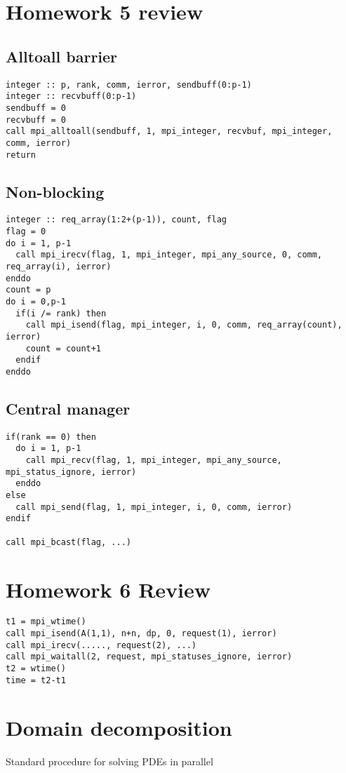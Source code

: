 \documentclass[10pt]{article}
\begin{document}
\section*{Homework 5 review}

\subsection*{Alltoall barrier}
\begin{verbatim}
integer :: p, rank, comm, ierror, sendbuff(0:p-1)
integer :: recvbuff(0:p-1)
sendbuff = 0
recvbuff = 0
call mpi_alltoall(sendbuff, 1, mpi_integer, recvbuf, mpi_integer, comm, ierror)
return
\end{verbatim}

\subsection*{Non-blocking}
\begin{verbatim}
integer :: req_array(1:2+(p-1)), count, flag
flag = 0
do i = 1, p-1
  call mpi_irecv(flag, 1, mpi_integer, mpi_any_source, 0, comm, req_array(i), ierror)
enddo
count = p
do i = 0,p-1
  if(i /= rank) then
    call mpi_isend(flag, mpi_integer, i, 0, comm, req_array(count), ierror)
    count = count+1
  endif
enddo
\end{verbatim}

\subsection*{Central manager}
\begin{verbatim}
if(rank == 0) then
  do i = 1, p-1
    call mpi_recv(flag, 1, mpi_integer, mpi_any_source, mpi_status_ignore, ierror)
  enddo
else
  call mpi_send(flag, 1, mpi_integer, i, 0, comm, ierror)
endif

call mpi_bcast(flag, ...)
\end{verbatim}

\section*{Homework 6 Review}
\begin{verbatim}
t1 = mpi_wtime()
call mpi_isend(A(1,1), n+n, dp, 0, request(1), ierror)
call mpi_irecv(....., request(2), ...)
call mpi_waitall(2, request, mpi_statuses_ignore, ierror)
t2 = wtime()
time = t2-t1
\end{verbatim}

\section*{Domain decomposition}
Standard procedure for solving PDEs in parallel
\end{document}
